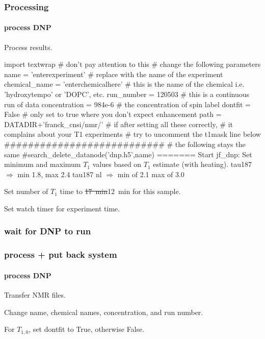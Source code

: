 \begin{scriptsize}
\begin{python}[off]
\subsubsection{Processing}

\paragraph{process DNP}
Process results.


\begin{scriptsize}
\begin{python}[off]
import textwrap # don't pay attention to this
# change the following parameters
name = 'enterexperiment' # replace with the name of the experiment
chemical_name = 'enterchemicalhere' # this is the name of the chemical i.e. 'hydroxytempo' or 'DOPC', etc.
run_number = 120503 # this is a continuous run of data
concentration = 984e-6 # the concentration of spin label
dontfit = False # only set to true where you don't expect enhancement
path = DATADIR+'franck_cnsi/nmr/'
# if after setting all these correctly,
# it complains about your T1 experiments
# try to uncomment the t1mask line below
###########################
# the following stays the same
#search_delete_datanode('dnp.h5',name)
=======
Start jf\_dnp: Set minimum and maximum $T_1$ values based on $T_1$ estimate (with heating).
tau187 $\Rightarrow$ min 1.8, max 2.4
tau187 nl $\Rightarrow$ min of 2.1 max of 3.0

Set number of $T_1$ time to \sout{17~min}12~min for this sample.

Set watch timer for experiment time.

\subsubsection{wait for DNP to run}

\subsubsection{process + put back system}
\paragraph{process DNP}
Transfer NMR files.

Change name, chemical names, concentration, and run number.

For $T_{1,0}$, set dontfit to True, otherwise False.


\end{python}
\end{scriptsize}
\end{python}
\end{scriptsize}

